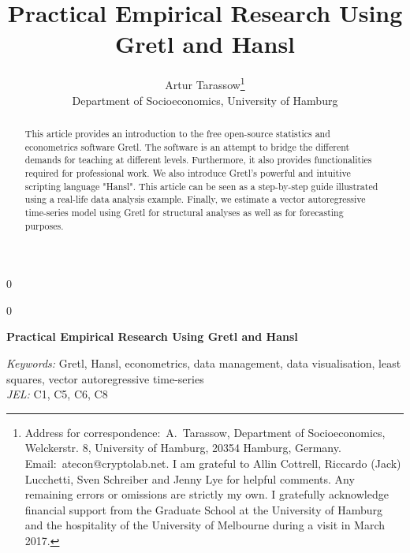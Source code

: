 \documentclass[11pt]{article}
\newcommand{\blind}{0}
\begin{document}
%

\def\spacingset#1{\renewcommand{\baselinestretch}%
	{#1}\small\normalsize} \spacingset{1}



\blind
{
	\title{\bf Practical Empirical Research Using Gretl and Hansl}
	\author{Artur Tarassow\thanks{
			\scriptsize Address for correspondence:\  A.\ Tarassow, Department of Socioeconomics, Welckerstr. 8, University of Hamburg, 20354 Hamburg, Germany. Email:\ atecon@cryptolab.net. I am grateful to Allin Cottrell, Riccardo (Jack) Lucchetti, Sven Schreiber and Jenny Lye for helpful comments. Any remaining errors or omissions are strictly my own. I gratefully acknowledge financial support from the Graduate School at the University of Hamburg and the hospitality of the University of Melbourne during a visit in March 2017.}\hspace{.2cm}\\
		Department of Socioeconomics, University of Hamburg}
	\date{}
	\maketitle
} \fi

\blind
{
	\bigskip
	\bigskip
	\bigskip
	\begin{center}
		{\LARGE\bf Practical Empirical Research Using Gretl and Hansl}
	\end{center}
	\medskip
} \fi


\bigskip
\begin{abstract}
	\noindent This article provides an introduction to the free open-source statistics and econometrics software Gretl. The software is an attempt to bridge the different demands for teaching at different levels. Furthermore, it also provides functionalities required for professional work. We also introduce Gretl's powerful and intuitive scripting language "Hansl". This article can be seen as a step-by-step guide illustrated using a real-life data analysis example. Finally, we estimate a vector autoregressive time-series model using Gretl for structural analyses as well as for forecasting purposes.
\end{abstract}

\noindent%
{\it Keywords:} Gretl, Hansl, econometrics, data management, data visualisation, least squares, vector autoregressive time-series \\
{\it JEL:} C1, C5, C6, C8
\end{document}
